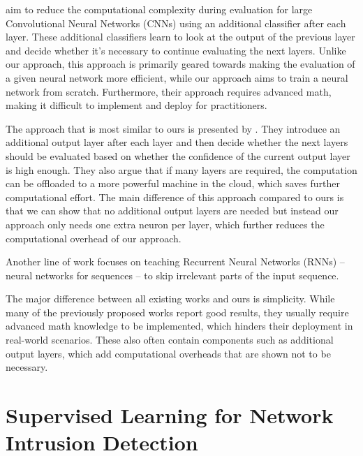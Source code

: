 \documentclass[conference]{IEEEtran}
\newcommand{\mynote}[3]{
    \fbox{\bfseries\sffamily\scriptsize#1}
    {\small$\blacktriangleright$\textsf{\emph{\color{#3}{#2}}}$\blacktriangleleft$}}
\newcommand{\todo}[1]{\mynote{TODO}{#1}{red}}
\begin{document}
\cite{bolukbasi_adaptive_2017} aim to reduce the computational complexity during evaluation for large Convolutional Neural Networks (CNNs) using an additional classifier after each layer. These additional classifiers learn to look at the output of the previous layer and decide whether it's necessary to continue evaluating the next layers. Unlike our approach, this approach is primarily geared towards making the evaluation of a given neural network more efficient, while our approach aims to train a neural network from scratch. Furthermore, their approach requires advanced math, making it difficult to implement and deploy for practitioners.

The approach that is most similar to ours is presented by \cite{leroux_resource-constrained_2015,leroux_cascading_2017}. They introduce an additional output layer after each layer and then decide whether the next layers should be evaluated based on whether the confidence of the current output layer is high enough. They also argue that if many layers are required, the computation can be offloaded to a more powerful machine in the cloud, which saves further computational effort. The main difference of this approach compared to ours is that we can show that no additional output layers are needed but instead our approach only needs one extra neuron per layer, which further reduces the computational overhead of our approach.

Another line of work \cite{seo_neural_2018,yu_learning_2017, graves_adaptive_2017, bachl_sparseids_2020} focuses on teaching Recurrent Neural Networks (RNNs) -- neural networks for sequences -- to skip irrelevant parts of the input sequence.

The major difference between all existing works and ours is simplicity. While many of the previously proposed works report good results, they usually require advanced math knowledge to be implemented, which hinders their deployment in real-world scenarios. These also often contain components such as additional output layers, which add computational overheads that are shown not to be necessary.

\section{Supervised Learning for Network Intrusion Detection}

\end{document}
